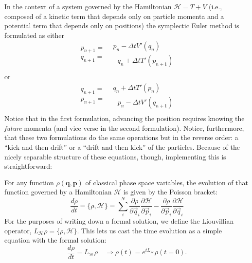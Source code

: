 \documentclass{article}
\begin{document}
In the context of a system governed by the Hamiltonian $\mathcal{H} = T+V$ (i.e., composed of a kinetic term that depends only on particle momenta and a potential term that depends only on positions) the symplectic Euler method is formulated as either
\begin{equation}\label{eq:symEul1}
   \begin{matrix}
   p_{n+1} = \\
   q_{n+1} = \\
   \end{matrix}
   \  \
   \begin{matrix}
   p_n - \Delta t V'(q_n)\\
   \ \ \ q_n + \Delta t T'(p_{n+1})\\
   \end{matrix}
\end{equation}
or
\begin{equation}\label{eq:symEul2}
   \begin{matrix}
       q_{n+1} = \\
       p_{n+1} = \\
   \end{matrix}
   \  \
   \begin{matrix}
       q_n + \Delta t T'(p_{n})\\
   \ \ \ p_n - \Delta t V'(q_{n+1})\\
   \end{matrix}
\end{equation}
Notice that in the first formulation, advancing the position requires knowing the \emph{future} momenta (and vice verse in the second formulation).
Notice, furthermore, that these two formulations do the same operations but in the reverse order: a ``kick and then drift'' or a ``drift and then kick'' of the particles.
Because of the nicely separable structure of these equations, though, implementing this is straightforward:



For any function $\rho(\mathbf{q},\mathbf{p})$ of classical phase space variables, the evolution of that function governed by a Hamiltonian $\mathcal{H}$ is given by the Poisson bracket:
\begin{equation}
    \frac{d\rho}{dt} = \{ \rho,\mathcal{H} \} = \sum_i^N \frac{\partial\rho}{\partial\vec{q}_i}\frac{\partial\mathcal{H}}{\partial \vec{p}_i} - \frac{\partial\rho}{\partial\vec{p}_i}\frac{\partial\mathcal{H}}{\partial\vec{q}_i}
\end{equation}
For the purposes of writing down a formal solution, we define the Liouvillian operator, $L_{\mathcal{H}} \rho = \{ \rho, \mathcal{H} \}$.
This lets us cast the time evolution as a simple equation with the formal solution:
\begin{equation}
    \frac{d\rho}{dt} = L_{\mathcal{H}} \rho \quad \Rightarrow \rho(t) = e^{t L_{\mathcal{H}}} \rho(t=0).
\end{equation}
\end{document}
